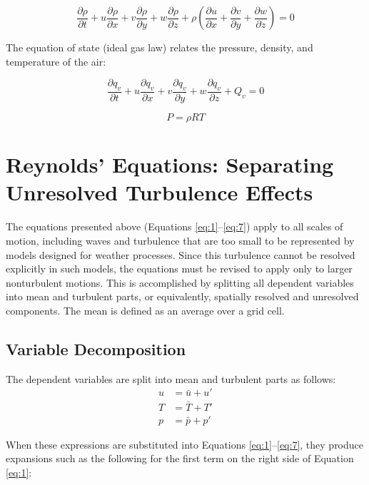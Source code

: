 \documentclass{article}
\begin{document}
\begin{equation}
\frac{\partial \rho}{\partial t} + u\frac{\partial \rho}{\partial x} + v\frac{\partial \rho}{\partial y} + w\frac{\partial \rho}{\partial z} + \rho\left(\frac{\partial u}{\partial x} + \frac{\partial v}{\partial y} + \frac{\partial w}{\partial z}\right) = 0
\label{eq:5}
\end{equation}

The equation of state (ideal gas law) relates the pressure, density, and temperature of the air:


\begin{equation}
\frac{\partial q_v}{\partial t} + u\frac{\partial q_v}{\partial x} + v\frac{\partial q_v}{\partial y} + w\frac{\partial q_v}{\partial z} + Q_v = 0
\label{eq:6}
\end{equation}



\begin{equation}
P = \rho RT
\label{eq:7}
\end{equation}

\section{Reynolds' Equations: Separating Unresolved Turbulence Effects}

The equations presented above (Equations \ref{eq:1}--\ref{eq:7}) apply to all scales of motion, including waves and turbulence that are too small to be represented by models designed for weather processes. Since this turbulence cannot be resolved explicitly in such models, the equations must be revised to apply only to larger nonturbulent motions. This is accomplished by splitting all dependent variables into mean and turbulent parts, or equivalently, spatially resolved and unresolved components. The mean is defined as an average over a grid cell.

\subsection{Variable Decomposition}
The dependent variables are split into mean and turbulent parts as follows:
\begin{align}
u &= \bar{u} + u' \label{eq:8} \\
T &= \bar{T} + T' \label{eq:9} \\
p &= \bar{p} + p' \label{eq:10}
\end{align}

When these expressions are substituted into Equations \ref{eq:1}--\ref{eq:7}, they produce expansions such as the following for the first term on the right side of Equation \ref{eq:1}:
\end{document}
